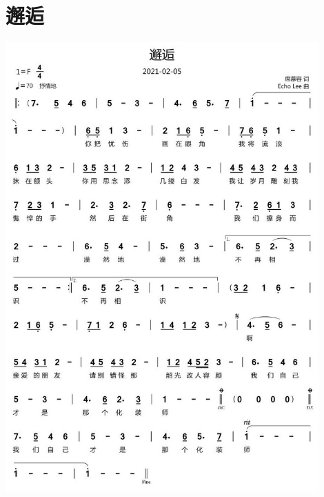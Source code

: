 \documentclass[cn,pad,twocol]{elegantbook}
\begin{document}
\section{邂逅} \includegraphics[width=0.9\textwidth]{macos/20210208邂逅.jpg}
\end{document}

